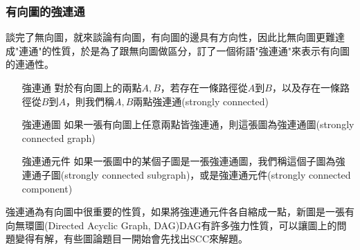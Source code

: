 \subsubsection{有向圖的強連通}
談完了無向圖，就來談論有向圖，有向圖的邊具有方向性，因此比無向圖更難達成"連通"的性質，於是為了跟無向圖做區分，訂了一個術語"強連通"來表示有向圖的連通性。
\begin{enumerate}
\item [強連通] 對於有向圖上的兩點$A,B$，若存在一條路徑從$A$到$B$，以及存在一條路徑從$B$到$A$，則我們稱$A,B$兩點強連通(strongly connected)
\item [強連通圖] 如果一張有向圖上任意兩點皆強連通，則這張圖為強連通圖(strongly connected graph)
\item [強連通元件] 如果一張圖中的某個子圖是一張強連通圖，我們稱這個子圖為強連通子圖(strongly connected subgraph)，或是強連通元件(strongly connected component)
\end{enumerate}
強連通為有向圖中很重要的性質，如果將強連通元件各自縮成一點，新圖是一張有向無環圖(Directed Acyclic Graph, DAG)DAG有許多強力性質，可以讓圖上的問題變得有解，有些圖論題目一開始會先找出SCC來解題。
